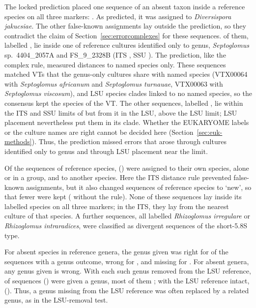 \documentclass[11pt]{article}
\newcommand{\spn}[1]{\emph{#1}}   %
\begin{document}
The locked prediction placed one sequence of an absent taxon inside a reference species on all three markers:
\EkLockedCase{}. As predicted, it was assigned to \spn{Diversispora jakucsiae}. The other \EkFxOutside{}
false-known assignments lay outside the prediction, so they contradict the claim of
Section~\ref{sec:errorcomplexes} for these sequences. \EkFxGenusOnlyInside{} of them, labelled
\EkFxGenusOnlyTaxa{}, lie inside one of \EkFxGenusOnlyCultures{} reference cultures identified only to genus,
\spn{Septoglomus} sp.\ 4404\_2057A and FS\_9\_2328B (ITS \EkFxGenusOnlyITS{}, SSU \EkFxGenusOnlySSU{}). The
prediction, like the complex rule, measured distances to named species only. These sequences matched VTs that the
genus-only cultures share with named species (VTX00064 with \spn{Septoglomus africanum} and \spn{Septoglomus
turnauae}, VTX00063 with \spn{Septoglomus viscosum}), and LSU species clades linked to no named species, so the
consensus kept the species of the VT. The other \EkFxNotInside{} sequences, labelled \EkFxNotInsideTaxa{}, lie
within the ITS and SSU limits of \EkFxNotInsideAssigned{} but \EkFxNotInsideLSU{} from it in the LSU, above the LSU
limit; LSU placement nevertheless put them in its clade. Whether the EUKARYOME labels or the culture names are right
cannot be decided here (Section~\ref{sec:euk-methods}). Thus, the prediction missed errors that arose through
cultures identified only to genus and through LSU placement near the limit.

Of the \EkKnownN{} sequences of reference species, \EkKept{} (\EkKeptPct{}) were assigned to their own species,
alone or in a group, and \EkKnownOther{} to another species. Here the ITS distance rule prevented
\EkFxRulePrevented{} false-known assignments, but it also changed \EkNSixDemoted{} sequences of reference species to
`new', so that \EkFxRuleCost{} fewer were kept (\EkKeptvOne{} without the rule). None of these \EkNSixDemoted{}
sequences lay inside its labelled species on all three markers; in the ITS, they lay \EkFxRuleDemotedITS{} from the
nearest culture of that species. A further \EkFxKnownDivergent{} sequences, all labelled \spn{Rhizoglomus irregulare}
or \spn{Rhizoglomus intraradices}, were classified as divergent sequences of the short-5.8S type.

For absent species in reference genera, the genus given was right for \EkGenusRight{} of the \EkFxSpGenusScored{}
sequences with a genus outcome, wrong for \EkGenusWrong{}, and missing for \EkGenusNone{}. For absent genera, any
genus given is wrong. With each such genus removed from the LSU reference, \EkLinGenusGiven{} of \EkLinScored{}
sequences (\EkFxLinGivenPct{}) were given a genus, most of them \EkFxLinGivenTop{}; with the LSU reference intact,
\EkFxLinGivenA{} (\EkFxLinGivenAPct{}). Thus, a genus missing from the LSU reference was often replaced by a related
genus, as in the LSU-removal test.
\end{document}
